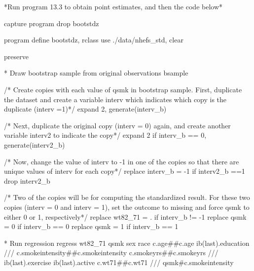 \documentclass[
  10pt,
  a4paper,
]{book}
\newenvironment{Shaded}{\begin{snugshade}}{\end{snugshade}}
\newcommand{\CommentTok}[1]{\textcolor[rgb]{0.37,0.37,0.37}{#1}}
\newcommand{\FunctionTok}[1]{\textcolor[rgb]{0.28,0.35,0.67}{#1}}
\newcommand{\KeywordTok}[1]{\textcolor[rgb]{0.00,0.46,0.62}{#1}}
\newcommand{\NormalTok}[1]{\textcolor[rgb]{0.00,0.46,0.62}{#1}}
\begin{document}
\begin{Shaded}
\begin{Highlighting}[]
\NormalTok{*Run }\KeywordTok{program}\NormalTok{ 13.3 to obtain point }\KeywordTok{estimates}\NormalTok{, and then the code below*}

\KeywordTok{capture} \KeywordTok{program} \KeywordTok{drop}\NormalTok{ bootstdz}

\KeywordTok{program} \KeywordTok{define}\NormalTok{ bootstdz, rclass}
\KeywordTok{use}\NormalTok{ ./}\KeywordTok{data}\NormalTok{/nhefs\_std, }\KeywordTok{clear}

\KeywordTok{preserve}

\NormalTok{* Draw }\KeywordTok{bootstrap} \KeywordTok{sample}\NormalTok{ from original observations}
\KeywordTok{bsample} 
        
\CommentTok{/* Create copies with each value of qsmk in bootstrap sample.}
\CommentTok{First, duplicate the dataset and create a variable \textasciigrave{}interv\textasciigrave{} which}
\CommentTok{indicates which copy is the duplicate (interv =1)*/}
\NormalTok{expand 2, }\KeywordTok{generate}\NormalTok{(interv\_b)}

\CommentTok{/* Next, duplicate the original copy (interv = 0) again, and create}
\CommentTok{another variable \textasciigrave{}interv2\textasciigrave{} to indicate the copy*/}
\NormalTok{expand 2 }\KeywordTok{if}\NormalTok{ interv\_b == 0, }\KeywordTok{generate}\NormalTok{(interv2\_b)}

\CommentTok{/* Now, change the value of interv to {-}1 in one of the copies so that}
\CommentTok{there are unique values of interv for each copy*/}
\KeywordTok{replace}\NormalTok{ interv\_b = {-}1  }\KeywordTok{if}\NormalTok{ interv2\_b ==1}
\KeywordTok{drop}\NormalTok{ interv2\_b}

\CommentTok{/* Two of the copies will be for computing the standardized result.}
\CommentTok{For these two copies (interv = 0 and interv = 1), set the outcome to}
\CommentTok{missing and force qsmk to either 0 or 1, respectively*/}
\KeywordTok{replace}\NormalTok{ wt82\_71 = . }\KeywordTok{if}\NormalTok{ interv\_b != {-}1}
\KeywordTok{replace}\NormalTok{ qsmk = 0 }\KeywordTok{if}\NormalTok{ interv\_b == 0}
\KeywordTok{replace}\NormalTok{ qsmk = 1 }\KeywordTok{if}\NormalTok{ interv\_b == 1}

\NormalTok{* Run regression}
\KeywordTok{regress}\NormalTok{ wt82\_71 qsmk sex race c.age\#\#c.age ib(}\FunctionTok{last}\NormalTok{).education }\CommentTok{///}
\NormalTok{  c.smokeintensity\#\#c.smokeintensity c.smokeyrs\#\#c.smokeyrs }\CommentTok{///}
\NormalTok{  ib(}\FunctionTok{last}\NormalTok{).exercise ib(}\FunctionTok{last}\NormalTok{).active c.wt71\#\#c.wt71 }\CommentTok{///}
\NormalTok{  qsmk\#c.smokeintensity}


\end{Highlighting}
\end{Shaded}
\end{document}
